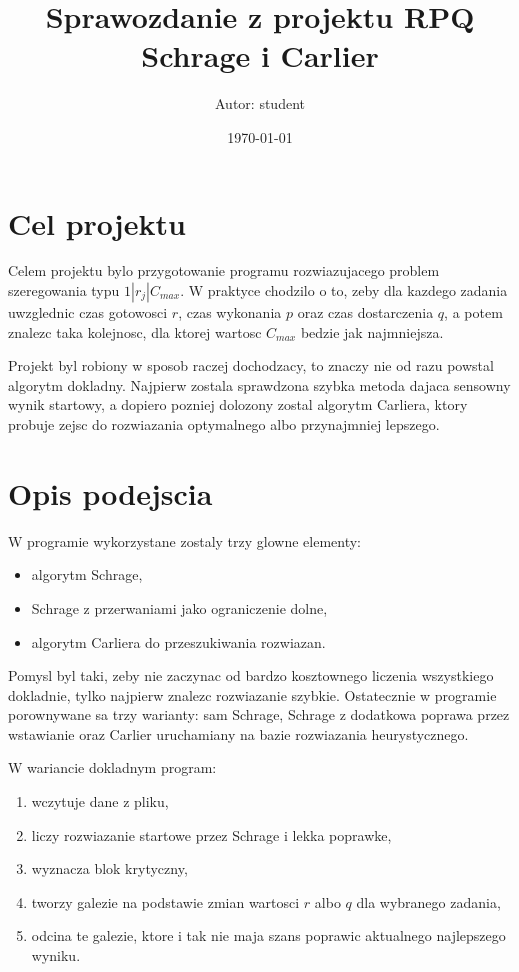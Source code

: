 \documentclass[12pt,a4paper]{article}
\title{Sprawozdanie z projektu RPQ\\\large Schrage i Carlier}
\author{Autor: student}
\date{\today}
\begin{document}
\maketitle

\section{Cel projektu}

Celem projektu bylo przygotowanie programu rozwiazujacego problem szeregowania typu $1|r_j|C_{max}$. W praktyce chodzilo o to, zeby dla kazdego zadania uwzglednic czas gotowosci $r$, czas wykonania $p$ oraz czas dostarczenia $q$, a potem znalezc taka kolejnosc, dla ktorej wartosc $C_{max}$ bedzie jak najmniejsza.

Projekt byl robiony w sposob raczej dochodzacy, to znaczy nie od razu powstal algorytm dokladny. Najpierw zostala sprawdzona szybka metoda dajaca sensowny wynik startowy, a dopiero pozniej dolozony zostal algorytm Carliera, ktory probuje zejsc do rozwiazania optymalnego albo przynajmniej lepszego.

\section{Opis podejscia}

W programie wykorzystane zostaly trzy glowne elementy:

\begin{itemize}
    \item algorytm Schrage,
    \item Schrage z przerwaniami jako ograniczenie dolne,
    \item algorytm Carliera do przeszukiwania rozwiazan.
\end{itemize}

Pomysl byl taki, zeby nie zaczynac od bardzo kosztownego liczenia wszystkiego dokladnie, tylko najpierw znalezc rozwiazanie szybkie. Ostatecznie w programie porownywane sa trzy warianty: sam Schrage, Schrage z dodatkowa poprawa przez wstawianie oraz Carlier uruchamiany na bazie rozwiazania heurystycznego.

W wariancie dokladnym program:

\begin{enumerate}
    \item wczytuje dane z pliku,
    \item liczy rozwiazanie startowe przez Schrage i lekka poprawke,
    \item wyznacza blok krytyczny,
    \item tworzy galezie na podstawie zmian wartosci $r$ albo $q$ dla wybranego zadania,
    \item odcina te galezie, ktore i tak nie maja szans poprawic aktualnego najlepszego wyniku.
\end{enumerate}
\end{document}
